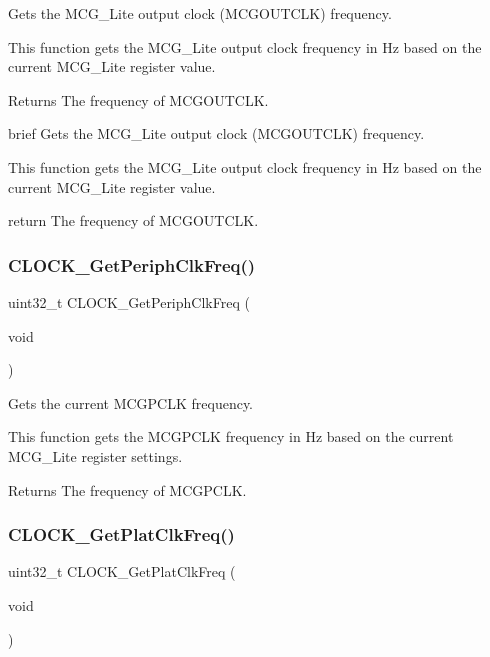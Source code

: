 Gets the M\+C\+G\+\_\+\+Lite output clock (M\+C\+G\+O\+U\+T\+C\+LK) frequency. 

This function gets the M\+C\+G\+\_\+\+Lite output clock frequency in Hz based on the current M\+C\+G\+\_\+\+Lite register value.

\begin{DoxyReturn}{Returns}
The frequency of M\+C\+G\+O\+U\+T\+C\+LK.
\end{DoxyReturn}
brief Gets the M\+C\+G\+\_\+\+Lite output clock (M\+C\+G\+O\+U\+T\+C\+LK) frequency.

This function gets the M\+C\+G\+\_\+\+Lite output clock frequency in Hz based on the current M\+C\+G\+\_\+\+Lite register value.

return The frequency of M\+C\+G\+O\+U\+T\+C\+LK. \mbox{\label{group__clock_gacee790e56c954e537658600aca0b9481}} 
\subsubsection{\texorpdfstring{CLOCK\_GetPeriphClkFreq()}{CLOCK\_GetPeriphClkFreq()}}
{\footnotesize\ttfamily uint32\+\_\+t C\+L\+O\+C\+K\+\_\+\+Get\+Periph\+Clk\+Freq (\begin{DoxyParamCaption}\item[{void}]{ }\end{DoxyParamCaption})}



Gets the current M\+C\+G\+P\+C\+LK frequency. 

This function gets the M\+C\+G\+P\+C\+LK frequency in Hz based on the current M\+C\+G\+\_\+\+Lite register settings.

\begin{DoxyReturn}{Returns}
The frequency of M\+C\+G\+P\+C\+LK. 
\end{DoxyReturn}
\mbox{\label{group__clock_gad6813b4059e476de162947021939d8dc}} 
\subsubsection{\texorpdfstring{CLOCK\_GetPlatClkFreq()}{CLOCK\_GetPlatClkFreq()}}
{\footnotesize\ttfamily uint32\+\_\+t C\+L\+O\+C\+K\+\_\+\+Get\+Plat\+Clk\+Freq (\begin{DoxyParamCaption}\item[{void}]{ }\end{DoxyParamCaption})}



